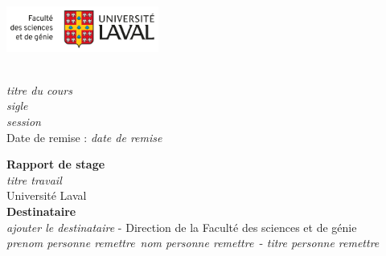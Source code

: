 \documentclass[12pt]{article}
\newcommand{\titreDuCours}{\textit{titre du cours}}
\newcommand{\sigleCoursStage}{\textit{sigle}}
\newcommand{\session}{\textit{session}}
\newcommand{\titreTravail}{\textit{titre travail}}
\newcommand{\nomOrganisation}{Université Laval}
\newcommand{\dateRemise}{\textit{date de remise}}
\newcommand{\prenomSuperviseur}{\textit{prenom personne remettre}}
\newcommand{\nomSuperviseur}{\textit{nom personne remettre}}
\newcommand{\titreSuperviseur}{\textit{titre personne remettre}}
\newcommand{\distTitreTravailEtNom}{4cm}
\newcommand{\distanceTypeRapportEtDestinataire}{5cm}
\begin{document}
	\thispagestyle{empty}
	\begin{minipage}[t]{8.1cm}
		\vspace{0pt}
		\begin{flushleft}
			\hspace{-1cm}
			\includegraphics[width=5cm]{../img/UL-FSG-C-g-3lignes.png}
			\\
		\end{flushleft}
	\end{minipage}
	\begin{minipage}[t]{8.1cm}
		\begin{flushright}
			\hspace*{2cm} \\ \hspace*{1cm}\titreDuCours\\ \hspace*{1cm}\sigleCoursStage\\ \hspace*{1cm}\session\\
			\hspace*{1cm} Date de remise : {\dateRemise}\\
		\end{flushright}
	\end{minipage}

	\vspace{\distTitreTravailEtNom}
	\begin{center}
		\fontsize{14.4}{14.4}\large \textbf{Rapport de stage}\\
		\vspace{1cm}
		\large {\titreTravail} \\
		\vspace{0.2cm}
		{\nomOrganisation} \\
		\vspace{\distanceTypeRapportEtDestinataire}
		\fontsize{14.4}{14.4}\textbf{Destinataire}\\ \large \textit{ajouter le destinataire}
		- Direction de la Faculté des sciences et de génie \\
		\vspace{0,5cm}
		\large \prenomSuperviseur~\nomSuperviseur~- \titreSuperviseur \\
	\end{center}
	\vspace{3cm}
\end{document}
